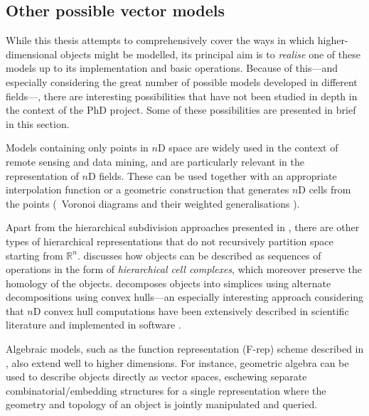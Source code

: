 \subsection{Other possible vector models}
\label{ss:vector-others}

While this thesis attempts to comprehensively cover the ways in which higher-dimensional objects might be modelled, its principal aim is to \emph{realise} one of these models up to its implementation and basic operations.
Because of this---and especially considering the great number of possible models developed in different fields---, there are interesting possibilities that have not been studied in depth in the context of the PhD project.
Some of these possibilities are presented in brief in this section.

Models containing only points in $n$D space \citep{Pasko01} are widely used in the context of remote sensing and data mining, and are particularly relevant in the representation of $n$D fields.
These can be used together with an appropriate interpolation function \citep{Miller97} or a geometric construction that generates $n$D cells from the points (\eg\ Voronoi diagrams \citep{Ledoux06} and their weighted generalisations \citep{Edelsbrunner14}).


Apart from the hierarchical subdivision approaches presented in , there are other types of hierarchical representations that do not recursively partition space starting from $\mathbb{R}^n$.
\citet{Comic14} discusses how objects can be described as sequences of operations in the form of \emph{hierarchical cell complexes}, which moreover preserve the homology of the objects.
\citet{Bulbul09a} decomposes objects into simplices using alternate decompositions using convex hulls---an especially interesting approach considering that $n$D convex hull computations have been extensively described in scientific literature and implemented in software \citep{Lawson86,Seidel86,Barber96}.

Algebraic models, such as the function representation (F-rep) scheme \citep{Pasko95} described in , also extend well to higher dimensions.
For instance, geometric algebra \citep{Artin11} can be used to describe objects directly as vector spaces, eschewing separate combinatorial/embedding structures for a single representation where the geometry and topology of an object is jointly manipulated and queried.

